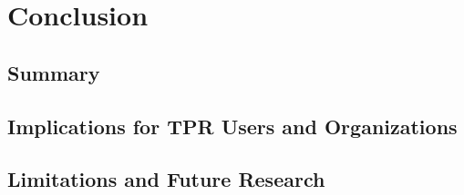 
\newpage
\section{Conclusion}


\subsection{Summary}


\subsection{Implications for TPR Users and Organizations}


\subsection{Limitations and Future Research}

